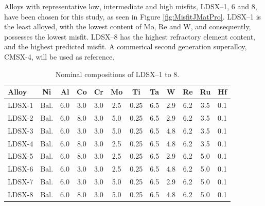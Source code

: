 Alloys with representative low, intermediate and high misfits, LDSX--1, 6 and 8, have been chosen for this study, as seen in Figure \ref{fig:MisfitJMatPro}.  LDSX--1 is the least alloyed, with the lowest content of Mo, Re and W, and consequently, possesses the lowest misfit.  LDSX--8 has the highest refractory element content, and the highest predicted misfit.  A commerical second generation superalloy, CMSX-4, will be used as reference.
%
\begin{table}[htdp]
\begin{center}
\begin{tabular}{lccccccccccc}
\hline\hline
Alloy 	&     Ni    &  Al   &  Co  &   Cr &   Mo     &Ti     & Ta    & W     &Re &    Ru    & Hf\\\hline
LDSX-1  &   Bal.&    6.0&    3.0&     3.0&     2.5&    0.25&    6.5&    2.9&    6.2&     3.5&     0.1\\LDSX-2    & Bal.&    6.0&    8.0&     3.0&     5.0&    0.25&    6.5&    2.9&    6.2&     3.5&     0.1\\LDSX-3     &Bal.&    6.0&    3.0&     3.0&     5.0&    0.25&    6.5&    4.8&    6.2&     3.5&     0.1\\LDSX-4 &    Bal.&    6.0&    8.0&     3.0&     2.5&    0.25&    6.5&    4.8&    6.2&     3.5&     0.1\\LDSX-5 &    Bal.&    6.0&    8.0&     3.0&     2.5&    0.25&    6.5&    2.9&    6.2&     5.0&     0.1\\LDSX-6  &   Bal.&    6.0&    3.0&     3.0&     2.5&    0.25&    6.5&    4.8&    6.2&     5.0&     0.1\\LDSX-7  &   Bal.&    6.0&    3.0&     3.0&     5.0&    0.25&    6.5&    2.9&    6.2&     5.0&     0.1\\LDSX-8  &   Bal.&    6.0&    8.0&     3.0&     5.0&    0.25&    6.5&    4.8&    6.2&     5.0&     0.1\\
\hline\hline
\end{tabular}
\end{center}
\caption{Nominal compositions of LDSX--1 to 8.}\label{tab:LDSXcomps}
\end{table}
%
